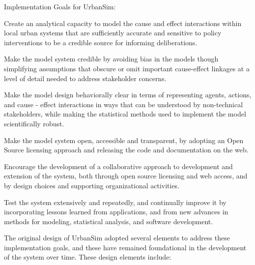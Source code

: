 Implementation Goals for UrbanSim:
\squishlist
\item Create an analytical capacity to model the cause and effect interactions within local urban systems that are sufficiently accurate and sensitive to policy interventions to be a credible source for informing deliberations.
\item Make the model system credible by avoiding bias in the models though simplifying assumptions that obscure or omit important cause-effect linkages at a level of detail needed to address stakeholder concerns.
\item Make the model design behaviorally clear in terms of representing agents, actions, and cause - effect interactions in ways that can be understood by non-technical stakeholders, while making the statistical methods used to implement the model scientifically robust.
\item Make the model system open, accessible and transparent, by adopting an Open Source licensing approach and releasing the code and documentation on the web.
\item Encourage the development of a collaborative approach to development and extension of the system, both through open source licensing and web access, and by design choices and supporting organizational activities.
\item Test the system extensively and repeatedly, and continually improve it by incorporating lessons learned from applications, and from new advances in methods for modeling, statistical analysis, and software development.
\squishend

The original design of UrbanSim adopted several elements to address these implementation goals, and these have remained foundational in the development of the system over time.  These design elements include:

